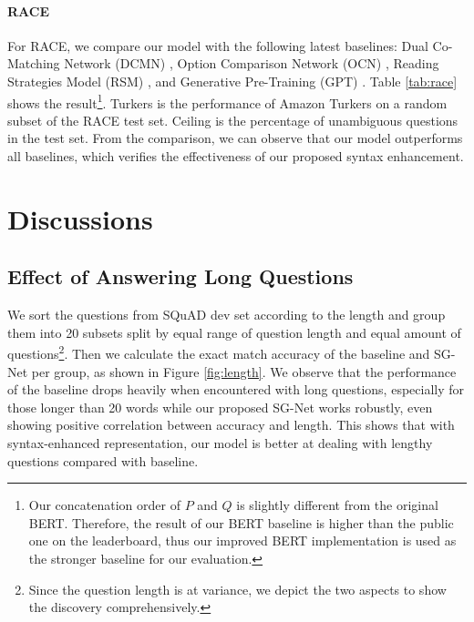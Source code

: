 \documentclass[letterpaper]{article} \usepackage{color}
\begin{document}
\paragraph{RACE} For RACE, we compare our model with the following latest baselines: Dual Co-Matching Network (DCMN) \cite{zhang2019dual}, Option Comparison Network (OCN) \cite{ran2019option}, Reading Strategies Model (RSM) \cite{sun2018improving}, and Generative Pre-Training (GPT) \cite{radford2018improving}. Table \ref{tab:race} shows the result\footnote{Our concatenation order of $P$ and $Q$ is slightly different from the original BERT. Therefore, the result of our BERT baseline is higher than the public one on the leaderboard, thus our improved BERT implementation is used as the stronger baseline for our evaluation.}. Turkers is the performance of Amazon Turkers on a random subset of the RACE test set. Ceiling is the percentage of unambiguous questions in the test set. From the comparison, we can observe that our model outperforms all baselines, which verifies the effectiveness of our proposed syntax enhancement.



\section{Discussions}

\subsection{Effect of Answering Long Questions}
\label{sec:long}
We sort the questions from SQuAD dev set according to the length and group them into 20 subsets split by equal range of question length and equal amount of questions\footnote{Since the question length is at variance, we depict the two aspects to show the discovery comprehensively.}. Then we calculate the exact match accuracy of the baseline and SG-Net per group, as shown in Figure \ref{fig:length}. We observe that the performance of the baseline drops heavily when encountered with long questions, especially for those longer than 20 words while our proposed SG-Net works robustly, even showing positive correlation between accuracy and length. This shows that with syntax-enhanced representation, our model is better at dealing with lengthy questions compared with baseline.
\end{document}

